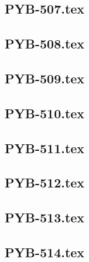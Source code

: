 \renewcommand{\xxexo}{PYB-507.tex} 
\subsection*{\xxexo} 
\graphicspath{{../../exos/python_bases/PYB-507/}}
 
 
\renewcommand{\xxexo}{PYB-508.tex} 
\subsection*{\xxexo} 
\graphicspath{{../../exos/python_bases/PYB-508/}}
 
 
\renewcommand{\xxexo}{PYB-509.tex} 
\subsection*{\xxexo} 
\graphicspath{{../../exos/python_bases/PYB-509/}}
 
 
\renewcommand{\xxexo}{PYB-510.tex} 
\subsection*{\xxexo} 
\graphicspath{{../../exos/python_bases/PYB-510/}}
 
 
\renewcommand{\xxexo}{PYB-511.tex} 
\subsection*{\xxexo} 
\graphicspath{{../../exos/python_bases/PYB-511/}}
 
 
\renewcommand{\xxexo}{PYB-512.tex} 
\subsection*{\xxexo} 
\graphicspath{{../../exos/python_bases/PYB-512/}}
 
 
\renewcommand{\xxexo}{PYB-513.tex} 
\subsection*{\xxexo} 
\graphicspath{{../../exos/python_bases/PYB-513/}}
 
 
\renewcommand{\xxexo}{PYB-514.tex} 
\subsection*{\xxexo} 
\graphicspath{{../../exos/python_bases/PYB-514/}}
 
 

